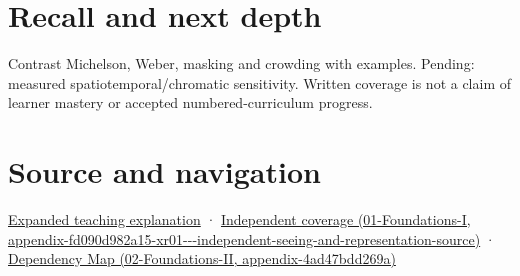 \section{Recall and next depth}\label{appendix-b3aa9e8e01ad-recall-and-next-depth}

Contrast Michelson, Weber, masking and crowding with examples. Pending: measured spatiotemporal/chromatic sensitivity. Written coverage is not a claim of learner mastery or accepted numbered-curriculum progress.

\section{Source and navigation}\label{appendix-b3aa9e8e01ad-source-and-navigation}

\href{Continuous\%20Notes/University\%20-\%20Worlds,\%20Images\%20and\%20Inference\%20-\%20Graphics,\%20Vision\%20and\%20Photography\#Visibility\%20is\%20about\%20contrast,\%20conditions\%20and\%20tasks}{Expanded teaching explanation} · \href{../01-Foundations-I/main.pdf\#nameddest=appendix-fd090d982a15-xr01---independent-seeing-and-representation-source}{Independent coverage (01-Foundations-I, appendix-fd090d982a15-xr01-\/-\/-independent-seeing-and-representation-source)} · \href{../02-Foundations-II/main.pdf\#nameddest=appendix-4ad47bdd269a}{Dependency Map (02-Foundations-II, appendix-4ad47bdd269a)}
